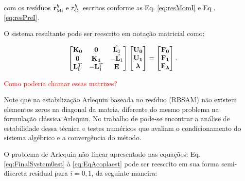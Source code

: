 \documentclass[tese_patricia]{subfiles}
\begin{document}
\noindent com os resíduos $\mathbf{r}_{\mathrm{Mi}}^{h}$ e $r_{\mathrm{Ci}}^{h}$ escritos conforme as Eq. \ref{eq:resMomI} e Eq .\ref{eq:resPreI}.

O sistema resultante pode ser reescrito em notação matricial como:

\begin{align}
	\begin{bmatrix}
		\mathbf{K_{0}} & \mathbf{0} & \hat{\mathbf{L}_{0}} \\
		\mathbf{0} & \mathbf{K_{1}} & - \hat{\mathbf{L}_{1}} \\
		\mathbf{L}_{0}^{T} & -\mathbf{L}_{1}^{T} & \mathbf{E}
	\end{bmatrix}
	\begin{bmatrix}
		\mathbf{U_{0}} \\
		\mathbf{U_{1}} \\
		\boldsymbol{\lambda}
	\end{bmatrix}
	&=
	\begin{bmatrix}
		\mathbf{F_{0}} \\
		\mathbf{F_{1}} \\
		\mathbf{F_{\boldsymbol{\lambda}}}
	\end{bmatrix}.
	\label{eq:sistema_linear}
\end{align}	

\textcolor{red}{Como poderia chamar essas matrizes?}

Note que na estabilização Arlequin baseada no resíduo (RBSAM) não existem elementos zeros na diagonal da matriz, diferente do mesmo problema na formulação clássica Arlequin. No trabalho de  pode-se encontrar a análise de estabilidade dessa técnica e testes numéricos que avaliam o condicionamento do sistema algébrico e a convergência do método.

O problema de Arlequin não linear apresentado nas equações: Eq. \ref{eq:FinalSystem0est} à \ref{eq:EqAcoplaest} pode ser reescrito em sua forma semi-discreta residual para $i=0,1$, da seguinte maneira:
\end{document}
